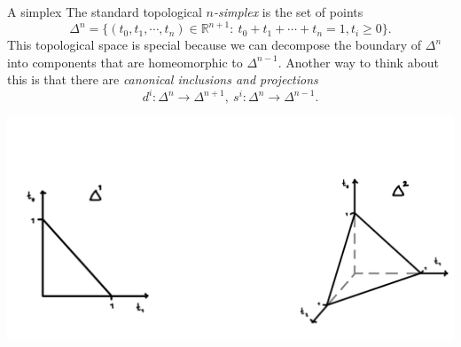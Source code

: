 \documentclass{beamer}
\newcommand{\R}[1]{\mathbb{R}^{#1}}
\begin{document}
\begin{frame}{A simplex}
The standard topological \emph{$n$-simplex} is the set of points
\[
\Delta^n = \{(t_0,t_1,\cdots,t_n)\in\R{n+1}: \: t_0+t_1+\cdots+t_n = 1, t_i \geq 0 \}.
\]
This topological space is special because we can decompose the boundary of $\Delta^n$ into components that are homeomorphic to $\Delta^{n-1}$. Another way to think about this is that there are \emph{canonical inclusions and projections}
\[
d^i:\Delta^n \to \Delta^{n+1}, \: s^i:\Delta^n \to \Delta^{n-1}.
\]
\begin{center}
\includegraphics[scale=0.06]{simplicies}
\end{center}
\end{frame}
\end{document}
